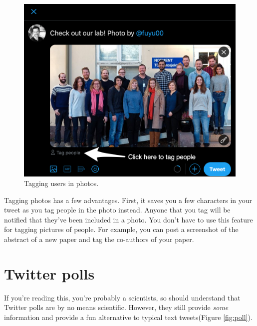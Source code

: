 \documentclass[]{book}
\begin{document}
\begin{figure}

{\centering \includegraphics[width=0.8\linewidth]{images/tag} 

}

\caption{Tagging users in photos.}\label{fig:tag}
\end{figure}

Tagging photos has a few advantages. First, it saves you a few characters in your tweet as you tag people in the photo instead. Anyone that you tag will be notified that they've been included in a photo. You don't have to use this feature for tagging pictures of people. For example, you can post a screenshot of the abstract of a new paper and tag the co-authors of your paper.

\hypertarget{twitter-polls}{%
\section{Twitter polls}\label{twitter-polls}}

If you're reading this, you're probably a scientists, so should understand that Twitter polls are by no means scientific. However, they still provide \emph{some} information and provide a fun alternative to typical text tweets(Figure \ref{fig:poll}).
\end{document}
